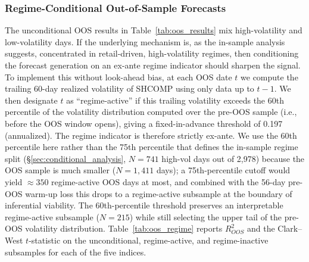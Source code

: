 \documentclass[AER]{AEA}
\begin{document}
\subsubsection{Regime-Conditional Out-of-Sample Forecasts}
\label{sec:regime_oos}

The unconditional OOS results in Table~\ref{tab:oos_results} mix high-volatility and low-volatility days. If the underlying mechanism is, as the in-sample analysis suggests, concentrated in retail-driven, high-volatility regimes, then conditioning the forecast generation on an ex-ante regime indicator should sharpen the signal. To implement this without look-ahead bias, at each OOS date $t$ we compute the trailing 60-day realized volatility of SHCOMP using only data up to $t-1$. We then designate $t$ as ``regime-active'' if this trailing volatility exceeds the 60th percentile of the volatility distribution computed over the pre-OOS sample (i.e., before the OOS window opens), giving a fixed-in-advance threshold of 0.197 (annualized). The regime indicator is therefore strictly ex-ante. We use the 60th percentile here rather than the 75th percentile that defines the in-sample regime split (\S\ref{sec:conditional_analysis}, $N=741$ high-vol days out of 2{,}978) because the OOS sample is much smaller ($N=1{,}411$ days); a 75th-percentile cutoff would yield $\approx 350$ regime-active OOS days at most, and combined with the 56-day pre-OOS warm-up loss this drops to a regime-active subsample at the boundary of inferential viability. The 60th-percentile threshold preserves an interpretable regime-active subsample ($N=215$) while still selecting the upper tail of the pre-OOS volatility distribution. Table~\ref{tab:oos_regime} reports $R^2_{OOS}$ and the Clark--West $t$-statistic on the unconditional, regime-active, and regime-inactive subsamples for each of the five indices.
\end{document}
